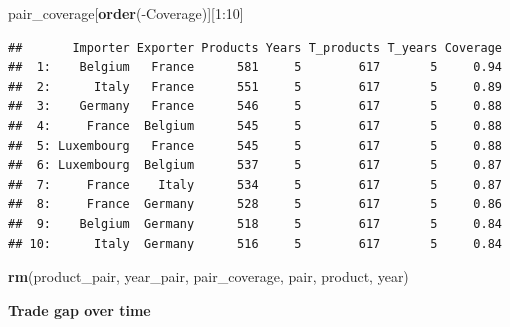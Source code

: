 \documentclass[10pt,]{article}
\newenvironment{Shaded}{\begin{snugshade}}{\end{snugshade}}
\newcommand{\KeywordTok}[1]{\textcolor[rgb]{0.13,0.29,0.53}{\textbf{{#1}}}}
\newcommand{\DecValTok}[1]{\textcolor[rgb]{0.00,0.00,0.81}{{#1}}}
\newcommand{\NormalTok}[1]{{#1}}
\begin{document}
\begin{Shaded}
\begin{Highlighting}[]
\NormalTok{pair_coverage[}\KeywordTok{order}\NormalTok{(-Coverage)][}\DecValTok{1}\NormalTok{:}\DecValTok{10}\NormalTok{]}
\end{Highlighting}
\end{Shaded}

\begin{verbatim}
##       Importer Exporter Products Years T_products T_years Coverage
##  1:    Belgium   France      581     5        617       5     0.94
##  2:      Italy   France      551     5        617       5     0.89
##  3:    Germany   France      546     5        617       5     0.88
##  4:     France  Belgium      545     5        617       5     0.88
##  5: Luxembourg   France      545     5        617       5     0.88
##  6: Luxembourg  Belgium      537     5        617       5     0.87
##  7:     France    Italy      534     5        617       5     0.87
##  8:     France  Germany      528     5        617       5     0.86
##  9:    Belgium  Germany      518     5        617       5     0.84
## 10:      Italy  Germany      516     5        617       5     0.84
\end{verbatim}

\begin{Shaded}
\begin{Highlighting}[]
\KeywordTok{rm}\NormalTok{(product_pair, year_pair, pair_coverage, pair, product, year)}
\end{Highlighting}
\end{Shaded}

\textbf{Trade gap over time}
\end{document}
